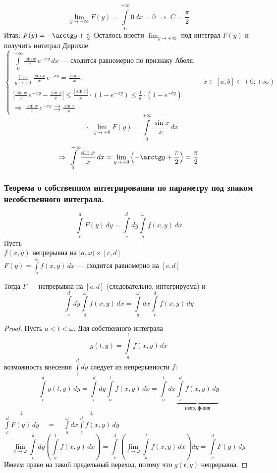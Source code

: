 \begin{example}
    \[ \lim_{y \to +\infty} F(y) = \int\limits_0^{+\infty} 0\,dx = 0 \;\Rightarrow\; C = \frac{\pi}2 \]
    Итак: $F(y) = -\arctg y + \frac{\pi}2$
    Осталось внести $\lim_{y \to +\infty}$ под интеграл $F(y)$ и получить интеграл Дирихле
    \[ \left\{\begin{array}{l} 
    \int\limits_0^{+\infty} \frac{\sin x}x\,e^{-xy}\,dx \text{ --- сходится равномерно по признаку Абеля}, \\
    \lim_{y \to +0} \frac{\sin x}x\,e^{-xy} = \frac{\sin x}x, \\
    \left| \frac{\sin x}x\,e^{-xy} - \frac{\sin x}x \right| \le \frac{|\sin x|}x \cdot \left( 1 - e^{-xy} \right) \le 
    \frac1a \cdot \left( 1 - e^{-by} \right) \\
    \Rightarrow\; \frac{\sin x}x\,e^{-xy} \rightrightarrows \frac{\sin x}x
    \end{array}\right. \ \ \ x \in [a; b] \subset (0; +\infty) \]
    \[ \Rightarrow\; \lim_{y \to +0} F(y) = \int\limits_0^{+\infty} \frac{\sin x}x\,dx \]
    \[ \Rightarrow\; \int\limits_0^{+\infty} \frac{\sin x}x\,dx = 
    \lim_{y \to +0} \left( -\arctg y + \frac{\pi}2 \right) = \frac{\pi}2 \]
\end{example}

\subsubsection{ Теорема о собственном интегрировании по параметру под знаком несобственного интеграла.}
\[ \int\limits_c^d F(y)\,dy = \int\limits_c^d dy \int\limits_a^{\omega} f(x, y)\,dx \]
Пусть \\
\phantom{Пусть} $f(x, y)$ непрерывна на $[a, \omega) \times [c, d]$ \\
\phantom{Пусть} $F(y) = \int\limits_a^{\omega} f(x, y)\,dx$ --- сходится равномерно на $[c, d]$

Тогда $F$ --- непрерывна на $[c, d]$ (следовательно, интегрируема) и 
\[ \int\limits_c^d dy \int\limits_a^{\omega} f(x, y)\,dx = \int\limits_a^{\omega} dx \int\limits_c^d f(x, y)\,dy \]
\begin{proof}
    Пусть $a < t < \omega$. Для собственного интеграла 
    \[ g(t, y) = \int\limits_a^t f(x, y)\,dx \]
    возможность внесения $\int\limits_c^d dy$ следует из непрерывности $f$:
    \[ \int\limits_c^d g(t, y)\,dy = \int\limits_c^d dy \int\limits_a^t f(x, y)\,dx = 
    \int\limits_a^t dx \underset{\text{непр. ф-ция}}{\underbrace{\int\limits_c^d f(x, y)\,dy}} \]
    \phantom{$\int\limits_c^d g(t, y)\,dy =\ \ \ \ \ $} $\overset{\downarrow}{\int\limits_c^d F(y)\,dy} \ \ \ \ \ = \ \ \ \ \ 
    \overset{\downarrow}{\int\limits_a^{\omega} dx \int\limits_c^d f(x, y)\,dy}$
    \[ \lim_{t \to \omega}\int\limits_c^d  dy \left( \int\limits_a^t f(x, y)\,dx \right) = 
    \int\limits_c^d \left( \lim_{t \to \omega} \int\limits_a^t f(x, y)\,dx \right) dy = \int\limits_c^d F(y)\,dy \]
    Имеем право на такой предельный переход, потому что $g(t, y)$ непрерывна.
\end{proof}

